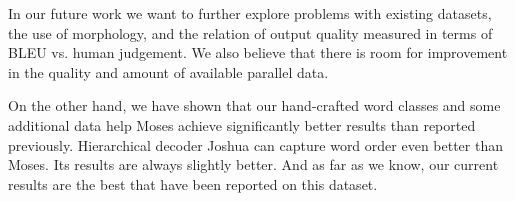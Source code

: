 \documentclass[11pt]{article}
\newcommand{\XXX}{\textcolor{red}{XXX }} %
\begin{document}
In our future work we want to further explore problems with existing datasets,
the use of morphology, and the relation of output quality measured in terms of
BLEU vs.
human
judgement. We also believe that there is room for improvement in the quality and
amount of available parallel data.

On the other hand, we have shown that our hand-crafted word classes and some
additional data help Moses achieve significantly better results than reported
previously. Hierarchical decoder Joshua can capture word order even better than
Moses. Its results are always slightly better. And as far as we know, our
current results are the best that have been reported on this dataset.



\begin{small}

\end{small}
\end{document}
